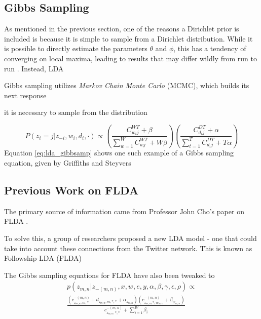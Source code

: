 \documentclass[a4paper]{article}
\begin{document}
\subsection{Gibbs Sampling}
As mentioned in the previous section, one of the reasons a Dirichlet prior is included is because it is simple to sample from a Dirichlet distribution. While it is possible to directly estimate the parameters $\theta$ and $\phi$, this has a tendency of converging on local maxima, leading to results that may differ wildly from run to run \cite{hoffman}. Instead, LDA 

Gibbs sampling utilizes \textit{Markov Chain Monte Carlo} (MCMC), which builds its next response 

it is necessary to sample from the distribution 




\begin{equation}\label{eq:lda_gibbsamp}
  P(z_i = j | z_{-i}, w_i, d_i, \cdot) \propto
    (\frac{C_{w_ij}^{WT} + \beta}
    {\sum\limits^W_{w = 1} C_{wj}^{WT} + W\beta})
    (\frac{C_{d_ij}^{DT} + \alpha}
    {\sum\limits^T_{t = 1} C_{d_ij}^{DT} + T\alpha})
\end{equation}
Equation \ref{eq:lda_gibbsamp} shows one such example of a Gibbs sampling equation, given by Griffiths and Steyvers \cite{griff}

\cite{lda}

\subsection{Previous Work on FLDA}
The primary source of information came from Professor John Cho's paper on FLDA \cite{flda}. 

To solve this, a group of researchers proposed a new LDA model - one that could take into account these connections from the Twitter network. This is known as Followship-LDA (FLDA)

The Gibbs sampling equations for FLDA have also been tweaked to 
\begin{equation}\label{eq:flda_sem}
  \begin{gathered}
    p(z_{m, n} | z_{-(m, n)}, x, w, e, y, \alpha, \beta, \gamma, \epsilon, \rho) \propto \\
      \frac{(c_{z_{m, n}, m, *}^{-(m, n)} + d_{z_{m, n}, m, *, *} + \alpha_{z_{m, n}})
      (c_{z_{m, n}, *, w_{m, n}}^{-(m, n)} + \beta_{w_{m, n}})}
      {c_{z_{m, n}, *, *}^{-(m, n)} + \sum^W_{i = 1}\beta_i}
  \end{gathered}
\end{equation}
\end{document}
